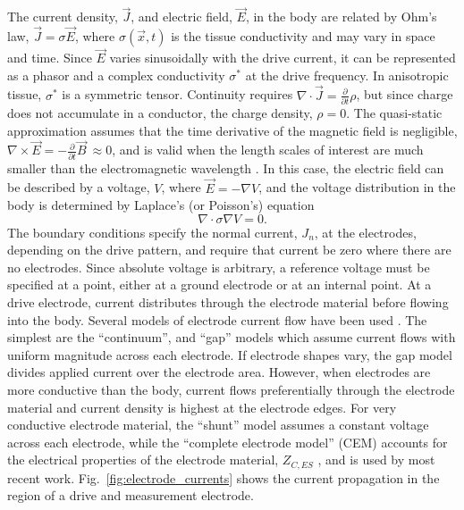 \documentclass[10pt,journal]{IEEEtran}\def\TBLWIDA{15mm}\def\TBLWIDB{60mm}
\newcommand\Fref[1]{Fig.\ \ref{#1}}
\newcommand{\JV}{\vec{J}}
\newcommand{\EV}{\vec{E}}
\newcommand{\BV}{\vec{B}}
\newcommand{\xV}{\vec{x}}
\begin{document}
The current density, $\JV$, and electric field, $\EV$,
in the body are related by Ohm's law, $\JV = \sigma \EV$,
where $\sigma(\xV, t)$ is the tissue conductivity
and may vary in space and time.
Since $\EV$ varies
sinusoidally with the drive current, it can be represented
as a phasor and a complex conductivity $\sigma^*$
at the drive frequency.
In anisotropic tissue, $\sigma^*$ is a symmetric tensor.
Continuity requires
$\nabla \cdot \JV = \frac{\partial}{\partial t}\rho$,
but since charge does not accumulate in a conductor,
 the charge density, $\rho=0$.
The quasi-static approximation assumes that the
time derivative of the magnetic field is negligible,
$\nabla \times \EV = -\frac{\partial}{\partial t}\BV ~\approx 0$,
and is valid when the length scales of interest are much
smaller than the electromagnetic wavelength \cite{Larsson2007Quasistatic}.
In this case, the electric field
 can be described by a voltage, $V$, where
$\EV = - \nabla  V$,
and the voltage distribution 
in the body is determined by 
Laplace's (or Poisson's) equation
\begin{equation}
 \nabla \cdot \sigma \nabla V = 0.
\label{eqn:LaplaceEqn}
\end{equation}
The boundary conditions specify the normal current, $J_n$, at the
electrodes, depending on the drive pattern, and require that current
be zero where there are no electrodes. Since absolute voltage
is arbitrary, a reference voltage must
be specified at a point, either at a ground electrode or 
at an internal point.
At a drive electrode, current distributes through
the electrode material before flowing into the body.
Several models of electrode current flow have been used
\cite{Cheney1999EIT}.
The simplest are the ``continuum'', and ``gap'' models  which assume
current flows with uniform magnitude across each electrode. If electrode
shapes vary, the gap model divides applied current over the electrode
area.  However, when electrodes
are more conductive than the body, 
current flows preferentially through the
electrode material and current density is highest at the
electrode edges. For very conductive electrode material, 
the ``shunt'' model assumes a constant voltage across
each electrode, while
the ``complete electrode model'' (CEM)
accounts for the electrical properties of the
electrode material, $Z_{C,ES}$ \cite{Cheng1989Complete}, and is used by
most recent work.
\Fref{fig:electrode_currents} shows the current propagation
in the region of a drive and measurement electrode.
\end{document}
